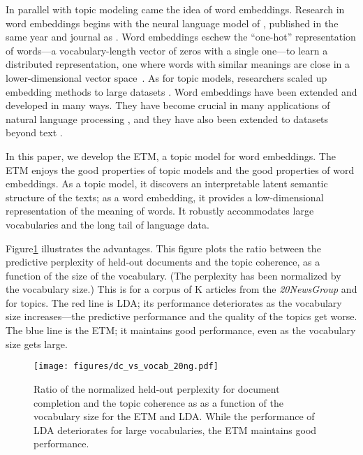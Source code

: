 \documentclass[11pt,a4paper]{article}
\begin{document}
In parallel with topic modeling came the idea of word embeddings.
Research in word embeddings begins with the neural language model of
\citet{Bengio:2003}, published in the same year and journal as
\citet{blei2003latent}. Word embeddings eschew the ``one-hot''
representation of words---a vocabulary-length vector of zeros with a
single one---to learn a distributed representation, one where words
with similar meanings are close in a lower-dimensional vector
space~\citep{Rumelhart:1973,bengio2006neural}.
As for topic models, researchers scaled
up embedding methods to large datasets
\citep{mikolov2013efficient,mikolov2013distributed,pennington2014glove,levy2014neural,mnih2013learning}.
Word embeddings have been extended and developed in many ways.  They
have become crucial in many applications of natural language
processing \citep{Li2017}, and they have also been extended to datasets
beyond text \citep{Rudolph2016}.

In this paper, we develop the \gls{ETM}, a topic model for word
embeddings. The \gls{ETM} enjoys the good properties of topic models
and the good properties of word embeddings.  As a topic model, it
discovers an interpretable latent semantic structure of the texts; as
a word embedding, it provides a low-dimensional representation of the
meaning of words.  It robustly accommodates large vocabularies and the
long tail of language data.

Figure\nobreakspace \ref {fig:log_lik_intro} illustrates the advantages.  This figure plots the
ratio between the predictive perplexity of held-out documents and the topic
coherence, as a function of the size of the vocabulary.
(The perplexity has been normalized by the vocabulary size.)
This is for a corpus of K articles from the \textit{20NewsGroup} and for  topics.  
The red line is \gls{LDA}; its performance deteriorates as the vocabulary size
increases---the predictive performance and the quality of the topics get worse. 
The blue line is the \gls{ETM};
it maintains good performance, even as the vocabulary size gets large.

\begin{figure}[t]
	\centering
	\texttt{[image: figures/dc\_vs\_vocab\_20ng.pdf]}
	\caption{Ratio of the normalized held-out perplexity for document completion
	and the topic coherence as as a function of the vocabulary size for the \acrshort{ETM} and \acrshort{LDA}. While the performance of \gls{LDA} deteriorates for large vocabularies, the \gls{ETM} maintains good performance.
	\label{fig:log_lik_intro}}
\end{figure}
\end{document}
